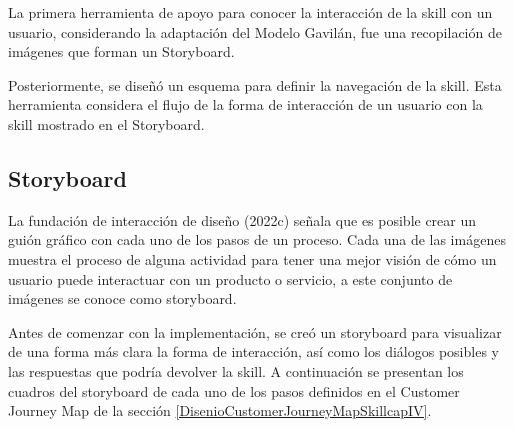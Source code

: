La primera herramienta de apoyo para conocer la interacción de la skill con un usuario, considerando la adaptación del Modelo Gavilán, fue una recopilación de imágenes que forman un Storyboard.

Posteriormente, se diseñó un esquema para definir la navegación de la skill. Esta herramienta considera el flujo de la forma de interacción de un usuario con la skill mostrado en el Storyboard.


\subsection{Storyboard}
\label{StoryboardcapIV}

La fundación de interacción de diseño (2022c) señala que es posible crear un guión gráfico con cada uno de los pasos de un proceso. Cada una de las imágenes muestra el proceso de alguna actividad para tener una mejor visión de cómo un usuario puede interactuar con un producto o servicio, a este conjunto de imágenes se conoce como storyboard.

Antes de comenzar con la implementación, se creó un storyboard para visualizar de una forma más clara la forma de interacción, así como los diálogos posibles y las respuestas que podría devolver la skill. A continuación se presentan los cuadros del storyboard de cada uno de los pasos definidos en el Customer Journey Map de la sección \ref{DisenioCustomerJourneyMapSkillcapIV}.

